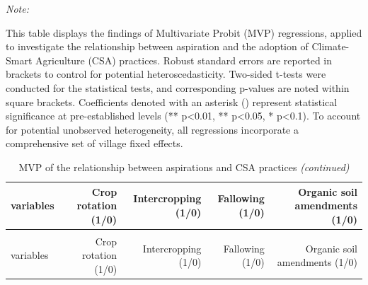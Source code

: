 \documentclass[
]{article}
\begin{document}
\begin{landscape}\begingroup\fontsize{7}{9}\selectfont

\begin{ThreePartTable}
\begin{TableNotes}[para]
\item \textit{Note: } 
\item This table displays the findings of Multivariate Probit (MVP) regressions, applied to investigate the relationship between aspiration and the adoption of Climate-Smart Agriculture (CSA) practices. Robust standard errors are reported in brackets to control for potential heteroscedasticity. Two-sided t-tests were conducted for the statistical tests, and corresponding p-values are noted within square brackets. Coefficients denoted with an asterisk () represent statistical significance at pre-established levels (** p<0.01, ** p<0.05, * p<0.1). To account for potential unobserved heterogeneity, all regressions incorporate a comprehensive set of village fixed effects.
\end{TableNotes}
\begin{longtable}[t]{lrrrr}
\caption{\label{tab:unnamed-chunk-13}MVP of the relationship between aspirations and CSA practices}\\
\toprule
variables & Crop rotation (1/0) & Intercropping (1/0) & Fallowing (1/0) & Organic soil amendments (1/0)\\
\midrule
\endfirsthead
\caption[]{\label{tab:unnamed-chunk-13}MVP of the relationship between aspirations and CSA practices \textit{(continued)}}\\
\toprule
variables & Crop rotation (1/0) & Intercropping (1/0) & Fallowing (1/0) & Organic soil amendments (1/0)\\
\midrule
\endhead


\end{longtable}
\end{ThreePartTable}
\end{landscape}
\end{document}

